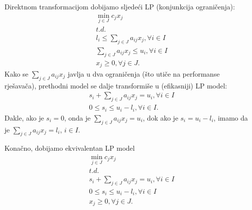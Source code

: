 \documentclass[a4paper, utf8, 11pt, colorlinks]{book}
\theoremstyle{definition}
\begin{document}
Direktnom transformacijom dobijamo sljedeći LP (konjunkcija ograničenja): 
\begin{align*}
	& \min_{j \in J } c_j x_j \\
    & t.d. \nonumber \\
	&  l_i \leq \sum_{j \in J} a_{ij} x_j, \forall i\in I \\
	&  \sum_{j \in J} a_{ij} x_j \leq u_i, \forall i\in I \\
	&  x_j \geq 0, \forall j \in J.
\end{align*}
Kako    se $\sum_{j \in J} a_{ij} x_j$ javlja u dva ograničenja (što utiče na performanse rješavača), prethodni model se dalje transformiše u (efikasniji) LP model:
\begin{align*}
	&s_i + \sum_{j \in J} a_{ij} x_j = u_i, \forall i \in I \\
	& 0 \leq s_i \leq  u_i - l_i, \forall i \in I.
\end{align*}
Dakle, ako je $s_i = 0$, onda je  $\sum_{j \in J} a_{ij} x_j = u_i$, dok ako je  $s_i = u_i - l_i$, imamo da je $\sum_{j \in J} a_{ij} x_j = l_i$, $i\in I$. 

Konačno, dobijamo ekvivalentan LP model
\begin{align*}
	&\min_{j \in J } c_j x_j \\
	& t.d. \nonumber \\
	&s_i + \sum_{j \in J} a_{ij} x_j = u_i, \forall i \in I \\ 
	&  0 \leq s_i \leq  u_i - l_i, \forall i \in I \\
	& x_j \geq 0, \forall j \in J.
\end{align*}
\end{document}
